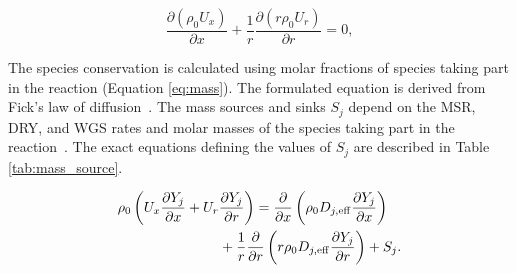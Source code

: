 \documentclass[preprint,12pt]{elsarticle}
\begin{document}
\begin{equation}
\label{eq:continuity}
 \frac {\partial \left( \rho_0 U_x  \right) }{\partial x}+\frac {1}{r} \frac {\partial \left(  r \rho_0 U_r  \right) }{\partial r}=0,
\end{equation}

\vspace{3mm}
  
 The species conservation is calculated using molar fractions of species taking part in the reaction (Equation \eqref{eq:mass}). The formulated equation is derived from Fick's law of diffusion~\cite{Mozdzierz2018}. The mass sources and sinks $S_j$ depend on the MSR, DRY, and WGS rates and molar masses of the species taking part in the reaction~\cite{Mozdzierz2014, Tan2018}.  The exact equations defining the values of $S_j$ are described in Table \ref{tab:mass_source}. 
   
\begin{eqnarray} 
\label{eq:mass}
\begin{multlined}
 \rho_0   \left( U_x \frac{\partial  Y_{j}}{\partial x} +   U_r \frac{\partial  Y_{j}}{\partial r} \right) = \frac {\partial}{\partial x} \left( \rho_0 D_{j, \rm{eff}}  \frac{\partial  Y_{j}}{\partial x} \right) \\
 + \frac{1}{r} \frac {\partial}{\partial r} \left( r \rho_0 D_{j, \rm{eff}}  \frac{\partial  Y_{j}}{\partial r} \right) + S_{j}.
 \end{multlined}
 \end{eqnarray}
 
\end{document}

